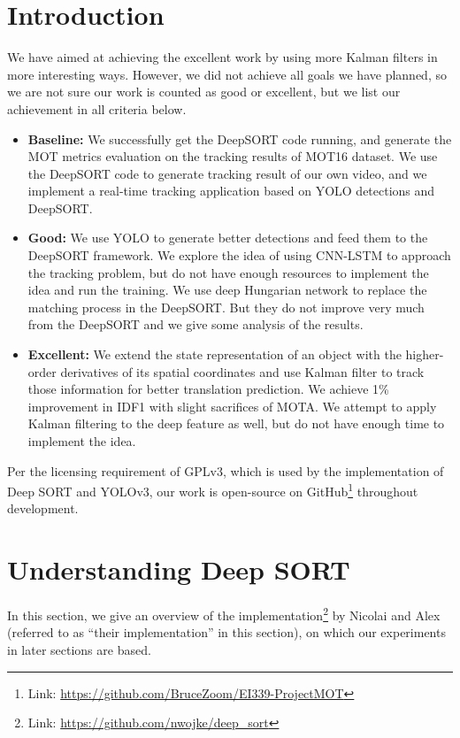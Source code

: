 \documentclass[conference]{IEEEtran}
\begin{document}
\section{Introduction}
We have aimed at achieving the excellent work by using more Kalman filters in more interesting ways.
However, we did not achieve all goals we have planned, so we are not sure our work is counted as good or excellent, but we list our achievement in all criteria below.
\begin{itemize}
    \item \textbf{Baseline:} We successfully get the DeepSORT code running, and generate the MOT metrics evaluation on the tracking results of MOT16 dataset. We use the DeepSORT code to generate tracking result of our own video, and we implement a real-time tracking application based on YOLO detections and DeepSORT.
    \item \textbf{Good:} We use YOLO \cite{redmon2016you}\cite{yolov3} to generate better detections and feed them to the DeepSORT framework. We explore the idea of using CNN-LSTM to approach the tracking problem, but do not have enough resources to implement the idea and run the training. We use deep Hungarian network \cite{xu2019deepmot} to replace the matching process in the DeepSORT. But they do not improve very much from the DeepSORT and we give some analysis of the results.
    \item \textbf{Excellent:} We extend the state representation of an object with the higher-order derivatives of its spatial coordinates and use Kalman filter to track those information for better translation prediction. We achieve 1\% improvement in IDF1 with slight sacrifices of MOTA. We attempt to apply Kalman filtering to the deep feature as well, but do not have enough time to implement the idea.
\end{itemize}

Per the licensing requirement of GPLv3, which is used by the implementation of Deep SORT and YOLOv3, our work is open-source on GitHub\footnote{Link: \url{https://github.com/BruceZoom/EI339-ProjectMOT}} throughout development.

\section{Understanding Deep SORT}

In this section, we give an overview of the implementation\footnote{Link: \url{https://github.com/nwojke/deep_sort}} by Nicolai and Alex \cite{Wojke2018deep} (referred to as ``their implementation'' in this section), on which our experiments in later sections are based.
\end{document}
